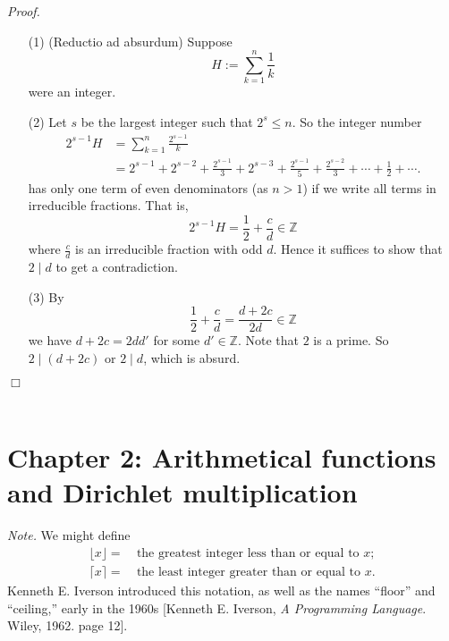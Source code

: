 \documentclass{article}
\begin{document}
\emph{Proof.}
\begin{enumerate}
\item[(1)]
  (Reductio ad absurdum)
  Suppose
  \[
    H := \sum_{k=1}^{n} \frac{1}{k}
  \]
  were an integer.

\item[(2)]
  Let $s$ be the largest integer such that $2^s \leq n$.
  So the integer number
  \begin{align*}
    2^{s-1} H
    &= \sum_{k=1}^{n} \frac{2^{s-1}}{k} \\
    &= 2^{s-1} + 2^{s-2} + \frac{2^{s-1}}{3} + 2^{s-3} + \frac{2^{s-1}}{5} + \frac{2^{s-2}}{3}
      + \cdots + \frac{1}{2} + \cdots.
  \end{align*}
  has only one term of even denominators (as $n > 1$)
  if we write all terms in irreducible fractions.
  That is,
  \[
  	2^{s-1} H = \frac{1}{2} + \frac{c}{d} \in \mathbb{Z}
  \]
  where $\frac{c}{d}$ is an irreducible fraction with odd $d$.
  Hence it suffices to show that $2 \mid d$ to get a contradiction.

\item[(3)]
  By
  \[
  	\frac{1}{2} + \frac{c}{d} = \frac{d + 2c}{2d} \in \mathbb{Z}
  \]
  we have $d + 2c = 2dd'$ for some $d' \in \mathbb{Z}$.
  Note that $2$ is a prime.
  So $2 \mid (d + 2c)$ or $2 \mid d$, which is absurd.
\end{enumerate}
$\Box$ \\\\






\newpage
\section*{Chapter 2: Arithmetical functions and Dirichlet multiplication \\}



\emph{Note.}
We might define
\begin{align*}
  \lfloor x \rfloor = &\: \text{the greatest integer less than or equal to $x$}; \\
  \lceil x \rceil = &\: \text{the least integer greater than or equal to $x$}.
\end{align*}
Kenneth E. Iverson introduced this notation, as well as the names ``floor'' and ``ceiling,''
early in the 1960s [Kenneth E. Iverson, \emph{A Programming Language}. Wiley, 1962. page 12]. \\
\end{document}
